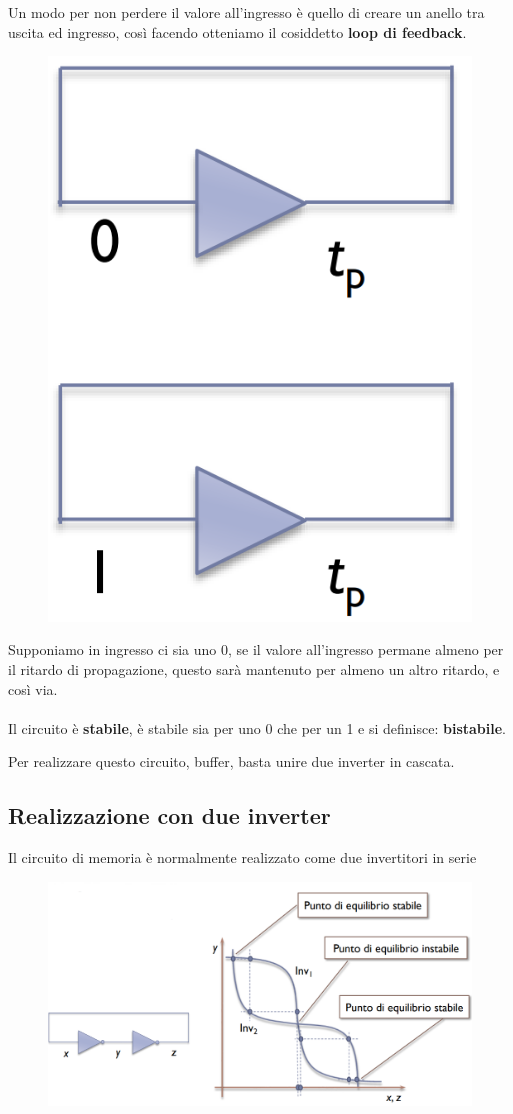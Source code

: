 Un modo per non perdere il valore all'ingresso è quello di creare un anello tra uscita ed ingresso, così facendo otteniamo il cosiddetto \textbf{loop di feedback}.
\newpage
\begin{figure}[htbp]
    \centering
    \includegraphics[width=0.25\linewidth]{img/feedback.png}
    
    
\end{figure}

Supponiamo in ingresso ci sia uno 0, se il valore all'ingresso permane almeno per il ritardo di
propagazione, questo sarà mantenuto per almeno un altro
ritardo, e così via.

\paragraph{}
Il circuito è \textbf{stabile}, è stabile sia per uno 0 che per un 1 e si definisce: \textbf{bistabile}.

Per realizzare questo circuito, buffer, basta unire due inverter in cascata.


\subsection{Realizzazione con due inverter}
Il circuito di memoria è normalmente realizzato come due
invertitori in serie



\begin{figure}[htbp]
    \centering
    \includegraphics[width=0.75\linewidth]{img/io_buffer.png}
    
    
\end{figure}

